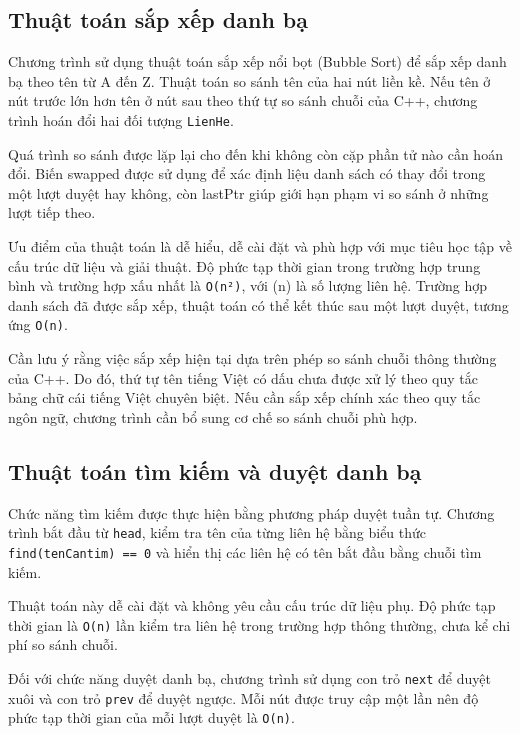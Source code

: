 \documentclass[12pt,a4paper]{report}
\begin{document}
\subsection{Thuật toán sắp xếp danh bạ}

Chương trình sử dụng thuật toán sắp xếp nổi bọt (Bubble Sort) để sắp xếp danh bạ theo tên từ A đến Z. Thuật toán so sánh tên của hai nút liền kề. Nếu tên ở nút trước lớn hơn tên ở nút sau theo thứ tự so sánh chuỗi của C++, chương trình hoán đổi hai đối tượng \texttt{LienHe}.\par
Quá trình so sánh được lặp lại cho đến khi không còn cặp phần tử nào cần hoán đổi. Biến swapped được sử dụng để xác định liệu danh sách có thay đổi trong một lượt duyệt hay không, còn lastPtr giúp giới hạn phạm vi so sánh ở những lượt tiếp theo.\par
Ưu điểm của thuật toán là dễ hiểu, dễ cài đặt và phù hợp với mục tiêu học tập về cấu trúc dữ liệu và giải thuật. Độ phức tạp thời gian trong trường hợp trung bình và trường hợp xấu nhất là \texttt{O(n²)}, với (n) là số lượng liên hệ. Trường hợp danh sách đã được sắp xếp, thuật toán có thể kết thúc sau một lượt duyệt, tương ứng \texttt{O(n)}.\par
Cần lưu ý rằng việc sắp xếp hiện tại dựa trên phép so sánh chuỗi thông thường của C++. Do đó, thứ tự tên tiếng Việt có dấu chưa được xử lý theo quy tắc bảng chữ cái tiếng Việt chuyên biệt. Nếu cần sắp xếp chính xác theo quy tắc ngôn ngữ, chương trình cần bổ sung cơ chế so sánh chuỗi phù hợp.\par
\subsection{Thuật toán tìm kiếm và duyệt danh bạ}

Chức năng tìm kiếm được thực hiện bằng phương pháp duyệt tuần tự. Chương trình bắt đầu từ \texttt{head}, kiểm tra tên của từng liên hệ bằng biểu thức \texttt{find(tenCantim) == 0} và hiển thị các liên hệ có tên bắt đầu bằng chuỗi tìm kiếm.\par
Thuật toán này dễ cài đặt và không yêu cầu cấu trúc dữ liệu phụ. Độ phức tạp thời gian là \texttt{O(n)} lần kiểm tra liên hệ trong trường hợp thông thường, chưa kể chi phí so sánh chuỗi.\par
Đối với chức năng duyệt danh bạ, chương trình sử dụng con trỏ \texttt{next} để duyệt xuôi và con trỏ \texttt{prev} để duyệt ngược. Mỗi nút được truy cập một lần nên độ phức tạp thời gian của mỗi lượt duyệt là \texttt{O(n)}.\par
\end{document}
